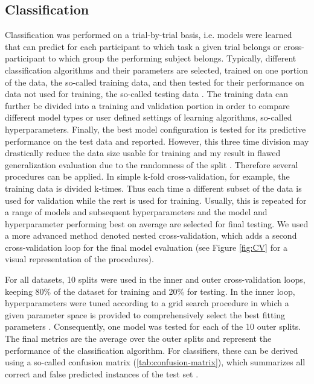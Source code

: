 \subsection{Classification}
Classification was performed on a trial-by-trial basis, i.e. models were learned that can predict for each participant to which task a given trial belongs or cross-participant to which group the performing subject belongs. Typically, different classification algorithms and their parameters are selected, trained on one portion of the data, the so-called training data, and then tested for their performance on data not used for training, the so-called testing data \cite{Daumé2017}. The training data can further be divided into a training and validation portion in order to compare different model types or user defined settings of learning algorithms, so-called hyperparameters. Finally, the best model configuration is tested for its predictive performance on the test data and reported. However, this three time division may drastically reduce the data size usable for training and my result in flawed generalization evaluation due to the randomness of the split \cite{VAROQUAUX2017166}. Therefore several procedures can be applied. In simple k-fold cross-validation, for example, the training data is divided k-times. Thus each time a different subset of the data is used for validation while the rest is used for training. Usually, this is repeated for a range of models and subsequent hyperparameters and the model and hyperparameter performing best on average are selected for final testing. We used a more advanced method denoted nested cross-validation, which adds a second cross-validation loop for the final model evaluation (see Figure \ref{fig:CV} for a visual representation of the procedures). 

\begin{figure*}[h]
\centering
   
  \caption[Nested cross-validation procedure]{Nested cross-validation procedure. CV: cross-validation}
  \label{fig:CV}
\end{figure*}

For all datasets, 10 splits were used in the inner and outer cross-validation loops, keeping 80\% of the dataset for training and 20\% for testing. In the inner loop, hyperparameters were tuned according to a grid search procedure in which a given parameter space is provided to comprehensively select the best fitting parameters \cite{VAROQUAUX2017166}. Consequently, one model was tested for each of the 10 outer splits. The final metrics are the average over the outer splits and represent the performance of the classification algorithm. For classifiers, these can be derived using a so-called confusion matrix (\autoref{tab:confusion-matrix}), which summarizes all correct and false predicted instances of the test set \cite{Fawcett2006}.  

